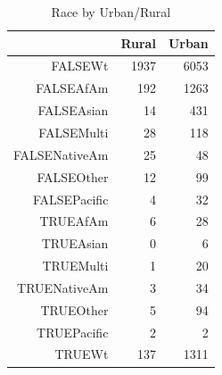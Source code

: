 \documentclass{article}
\begin{document}
\begin{table}[ht]
\centering
\begin{tabular}{rrr}
  \hline
 & Rural & Urban \\ 
  \hline
FALSEWt & 1937 & 6053 \\ 
  FALSEAfAm & 192 & 1263 \\ 
  FALSEAsian &  14 & 431 \\ 
  FALSEMulti &  28 & 118 \\ 
  FALSENativeAm &  25 &  48 \\ 
  FALSEOther &  12 &  99 \\ 
  FALSEPacific &   4 &  32 \\ 
  TRUEAfAm &   6 &  28 \\ 
  TRUEAsian &   0 &   6 \\ 
  TRUEMulti &   1 &  20 \\ 
  TRUENativeAm &   3 &  34 \\ 
  TRUEOther &   5 &  94 \\ 
  TRUEPacific &   2 &   2 \\ 
  TRUEWt & 137 & 1311 \\ 
   \hline
\end{tabular}
\caption{Race by Urban/Rural} 
\label{tab:UrbRural}
\end{table}
\end{document}
